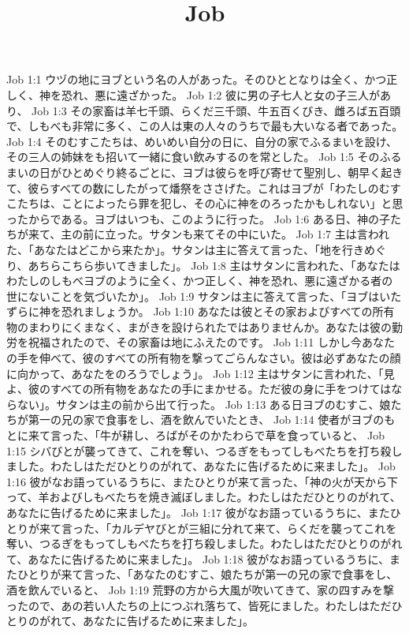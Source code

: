 

\title{Job}

Job 1:1  ウヅの地にヨブという名の人があった。そのひととなりは全く、かつ正しく、神を恐れ、悪に遠ざかった。
Job 1:2  彼に男の子七人と女の子三人があり、
Job 1:3  その家畜は羊七千頭、らくだ三千頭、牛五百くびき、雌ろば五百頭で、しもべも非常に多く、この人は東の人々のうちで最も大いなる者であった。
Job 1:4  そのむすこたちは、めいめい自分の日に、自分の家でふるまいを設け、その三人の姉妹をも招いて一緒に食い飲みするのを常とした。
Job 1:5  そのふるまいの日がひとめぐり終るごとに、ヨブは彼らを呼び寄せて聖別し、朝早く起きて、彼らすべての数にしたがって燔祭をささげた。これはヨブが「わたしのむすこたちは、ことによったら罪を犯し、その心に神をのろったかもしれない」と思ったからである。ヨブはいつも、このように行った。
Job 1:6  ある日、神の子たちが来て、主の前に立った。サタンも来てその中にいた。
Job 1:7  主は言われた、「あなたはどこから来たか」。サタンは主に答えて言った、「地を行きめぐり、あちらこちら歩いてきました」。
Job 1:8  主はサタンに言われた、「あなたはわたしのしもべヨブのように全く、かつ正しく、神を恐れ、悪に遠ざかる者の世にないことを気づいたか」。
Job 1:9  サタンは主に答えて言った、「ヨブはいたずらに神を恐れましょうか。
Job 1:10  あなたは彼とその家およびすべての所有物のまわりにくまなく、まがきを設けられたではありませんか。あなたは彼の勤労を祝福されたので、その家畜は地にふえたのです。
Job 1:11  しかし今あなたの手を伸べて、彼のすべての所有物を撃ってごらんなさい。彼は必ずあなたの顔に向かって、あなたをのろうでしょう」。
Job 1:12  主はサタンに言われた、「見よ、彼のすべての所有物をあなたの手にまかせる。ただ彼の身に手をつけてはならない」。サタンは主の前から出て行った。
Job 1:13  ある日ヨブのむすこ、娘たちが第一の兄の家で食事をし、酒を飲んでいたとき、
Job 1:14  使者がヨブのもとに来て言った、「牛が耕し、ろばがそのかたわらで草を食っていると、
Job 1:15  シバびとが襲ってきて、これを奪い、つるぎをもってしもべたちを打ち殺しました。わたしはただひとりのがれて、あなたに告げるために来ました」。
Job 1:16  彼がなお語っているうちに、またひとりが来て言った、「神の火が天から下って、羊およびしもべたちを焼き滅ぼしました。わたしはただひとりのがれて、あなたに告げるために来ました」。
Job 1:17  彼がなお語っているうちに、またひとりが来て言った、「カルデヤびとが三組に分れて来て、らくだを襲ってこれを奪い、つるぎをもってしもべたちを打ち殺しました。わたしはただひとりのがれて、あなたに告げるために来ました」。
Job 1:18  彼がなお語っているうちに、またひとりが来て言った、「あなたのむすこ、娘たちが第一の兄の家で食事をし、酒を飲んでいると、
Job 1:19  荒野の方から大風が吹いてきて、家の四すみを撃ったので、あの若い人たちの上につぶれ落ちて、皆死にました。わたしはただひとりのがれて、あなたに告げるために来ました」。

